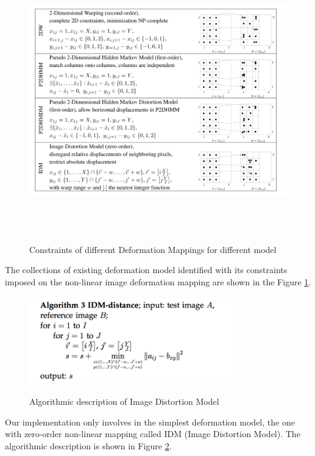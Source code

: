 \documentclass{article} %
\begin{document}
\begin{figure}[h]  
\begin{center}
    \includegraphics[width=5.5in,height=4.5in]{./images/NMAP.png} \\
    \caption{Constraints of different Deformation Mappings for different model} 
    \label{NMAP}
\end{center}
\end{figure}

The collections of existing deformation model identified with its constraints
imposed on the non-linear image deformation mapping are shown in the 
Figure \ref{NMAP}.


\begin{figure}[h] 
\begin{center}
    \includegraphics[width=3.5in,height=1.5in]{./images/IDM.png} \\
    \caption{Algorithmic description of Image Distortion Model} 
    \label{IDM}
\end{center}
\end{figure}
Our implementation only involves in the simplest deformation model, the one
with zero-order non-linear mapping called IDM (Image Distortion Model). The
algorithmic description is shown in Figure \ref{IDM}.
\end{document}
